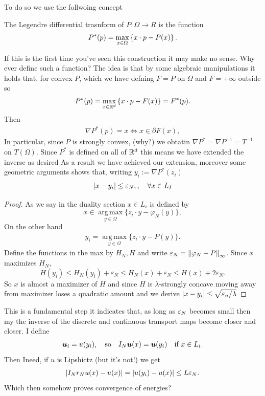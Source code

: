\documentclass[
    a4paper,
    DIV=13,
    abstract=true,
    numbers=noenddot
]{scrartcl}
\begin{document}
To do so we use the follwoing concept
\begin{definition}
    The Legendre differential trasnform of $P: \Omega \to R$ is the function 
    \begin{align*}
        P^*(p)= \maxs[x \in \Omega]{x \cdot p -P(x)}.
    \end{align*}
\end{definition}
If this is the first time you've seen this construction it may make no sense. Why ever define such a function? The idea is that by some algebraic manipulations it holds that, for convex $P$, which we have defning $F=P$ on $\Omega$ and $F=+ \infty$ outside so
    \begin{align*}
        P^*(p)= \maxs[x \in \R^d]{x \cdot p -F(x)}= F^*(p).
    \end{align*}
    Then
\begin{align*}
    \nabla P^*(p)=x \iff x \in \partial F(x),
\end{align*}
In particular, since $P$ is strongly convex, (why?) we obtatin $\nabla P^*= \nabla P ^{-1}= T ^{-1}$ on $T(\Omega)$. Since $ P^*$ is defined on all of $\R^d$ this means we have extended the inverse as desired
As a result we have achieved our extension, moreover some geometric arguments shows that,  writing $y_i:=\nabla P^*(z_i)$
\begin{align*}
 \abs{x- y_i}\le  \eps_N, ,\quad \forall x \in L_I
\end{align*}
\begin{proof}
   As we say in the duality section $x \in L_i$ is defined by
\[
x\in\operatorname*{arg\,max}_{y\in\Omega}\{z_i\cdot y-\varphi_N(y)\},\]
On the other hand 
\begin{align*}
    y_i=\operatorname*{arg\,max}_{y\in\Omega}\{z_i\cdot y-P(y)\}.
\end{align*}
Define the functions in the max by $H_N,H$ and write $\eps_N= \norm{\varphi_N-P}_ \infty$. Since $x$ maximizes $H_N$,
\[
H(y_i)\le H_N(y_i)+\varepsilon_N
\le H_N(x)+\varepsilon_N
\le H(x)+2\varepsilon_N.
\]
So $x$ is almost a maximizer of $H$ and since $H$ is $\lambda$-strongly concave moving away from maximizer loses a quadratic amount and we derive $\abs{x-y_i} \le  \sqrt{\eps_n /\lambda}$ 
\end{proof}

This is a fundamental step it indicates that, as long as $\eps_N$ becomes small then my the inverse of the discrete and continuous transport maps become closer and closer. I define
\begin{align*}
    \b{u}_i= u(y_i), \quad \text{so} \quad I_N \b{u}(x)=\b{u}(y_i) \quad \text{if } x \in L_i. 
\end{align*}
Then Ineed, if $u$ is Lipshictz (but it's not!) we get
\begin{align*}
    \abs{I_N r_N u(x) -u(x)}= \abs{u(y_i)-u(x)} \le L \eps_N.
\end{align*}
Which then somehow proves convergence of energies?
\end{document}
